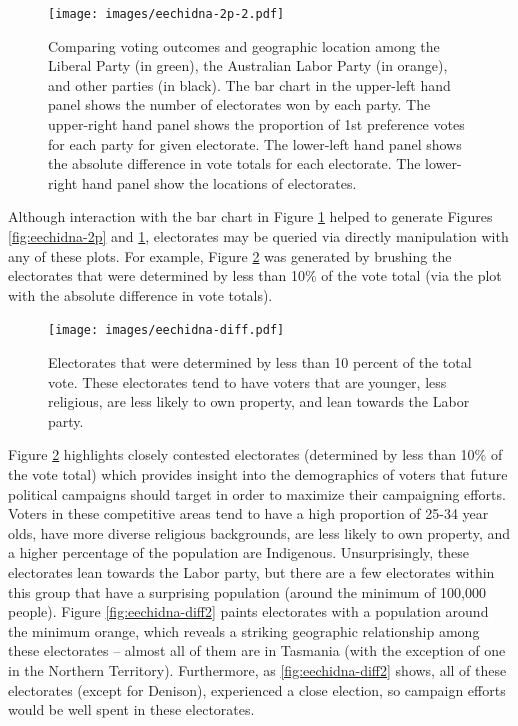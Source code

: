 \documentclass[12pt,]{isuthesis}
\begin{document}
\begin{figure}
\centering
\texttt{[image: images/eechidna-2p-2.pdf]}
\caption{\label{fig:eechidna-2p-2}Comparing voting outcomes and geographic
location among the Liberal Party (in green), the Australian Labor Party
(in orange), and other parties (in black). The bar chart in the
upper-left hand panel shows the number of electorates won by each party.
The upper-right hand panel shows the proportion of 1st preference votes
for each party for given electorate. The lower-left hand panel shows the
absolute difference in vote totals for each electorate. The lower-right
hand panel show the locations of electorates.}
\end{figure}

Although interaction with the bar chart in Figure
\ref{fig:eechidna-2p-2} helped to generate Figures \ref{fig:eechidna-2p}
and \ref{fig:eechidna-2p-2}, electorates may be queried via directly
manipulation with any of these plots. For example, Figure
\ref{fig:eechidna-diff} was generated by brushing the electorates that
were determined by less than 10\% of the vote total (via the plot with
the absolute difference in vote totals).

\begin{figure}
\centering
\texttt{[image: images/eechidna-diff.pdf]}
\caption{\label{fig:eechidna-diff}Electorates that were determined by less
than 10 percent of the total vote. These electorates tend to have voters
that are younger, less religious, are less likely to own property, and
lean towards the Labor party.}
\end{figure}

Figure \ref{fig:eechidna-diff} highlights closely contested electorates
(determined by less than 10\% of the vote total) which provides insight
into the demographics of voters that future political campaigns should
target in order to maximize their campaigning efforts. Voters in these
competitive areas tend to have a high proportion of 25-34 year olds,
have more diverse religious backgrounds, are less likely to own
property, and a higher percentage of the population are Indigenous.
Unsurprisingly, these electorates lean towards the Labor party, but
there are a few electorates within this group that have a surprising
population (around the minimum of 100,000 people). Figure
\ref{fig:eechidna-diff2} paints electorates with a population around the
minimum orange, which reveals a striking geographic relationship among
these electorates -- almost all of them are in Tasmania (with the
exception of one in the Northern Territory). Furthermore, as
\ref{fig:eechidna-diff2} shows, all of these electorates (except for
Denison), experienced a close election, so campaign efforts would be
well spent in these electorates.
\end{document}
